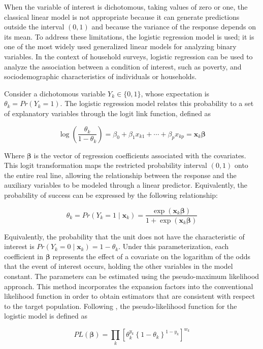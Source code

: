 \documentclass[
  english,
  12pt,
]{book}
\begin{document}
When the variable of interest is dichotomous, taking values of zero or one, the classical linear model is not appropriate because it can generate predictions outside the interval \((0,1)\) and because the variance of the response depends on its mean. To address these limitations, the logistic regression model is used; it is one of the most widely used generalized linear models for analyzing binary variables. In the context of household surveys, logistic regression can be used to analyze the association between a condition of interest, such as poverty, and sociodemographic characteristics of individuals or households.

Consider a dichotomous variable \(Y_k \in \{0,1\}\), whose expectation is \(\theta_k=Pr(Y_k=1)\). The logistic regression model relates this probability to a set of explanatory variables through the logit link function, defined as

\[
\log\left(\frac{\theta_k}{1-\theta_k}\right)
=
\beta_0+\beta_1x_{k1}+\cdots+\beta_px_{kp}
=\mathbf{x}_{k}\boldsymbol{\beta}
\]

Where \(\boldsymbol{\beta}\) is the vector of regression coefficients associated with the covariates. This logit transformation maps the restricted probability interval \((0,1)\) onto the entire real line, allowing the relationship between the response and the auxiliary variables to be modeled through a linear predictor. Equivalently, the probability of success can be expressed by the following relationship:

\[
\theta_k
=
Pr(Y_k = 1 \mid \mathbf{x}_k)
=
\frac{\exp(\mathbf{x}_k\boldsymbol{\beta})}
     {1+\exp(\mathbf{x}_k\boldsymbol{\beta})}
\]

Equivalently, the probability that the unit does not have the characteristic of interest is \(Pr(Y_k = 0 \mid \mathbf{x}_k) = 1-\theta_k\). Under this parameterization, each coefficient in \(\boldsymbol{\beta}\) represents the effect of a covariate on the logarithm of the odds that the event of interest occurs, holding the other variables in the model constant.
The parameters can be estimated using the pseudo-maximum likelihood approach. This method incorporates the expansion factors into the conventional likelihood function in order to obtain estimators that are consistent with respect to the target population. Following \citet{heeringa2017applied}, the pseudo-likelihood function for the logistic model is defined as

\[
PL(\boldsymbol{\beta})
=
\prod_{k}
\left[
\theta_{k}^{y_{k}}
\left\{
1-\theta_{k}
\right\}^{1-y_{k}}
\right]^{w_{k}}
\]
\end{document}
